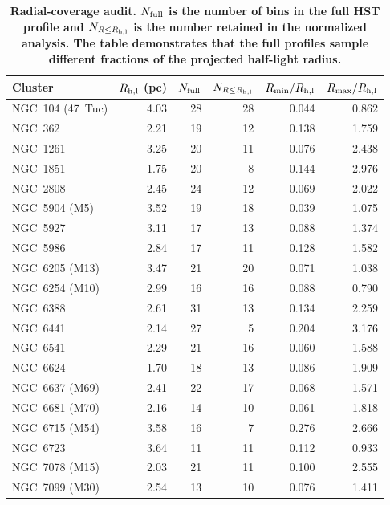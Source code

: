 \begin{table}
\centering
\caption{\textbf{Radial-coverage audit. $N_{\rm full}$ is the number of bins in the full HST profile and $N_{R\leq R_{\rm h,l}}$ is the number retained in the normalized analysis. The table demonstrates that the full profiles sample different fractions of the projected half-light radius.}}
\label{tab:coverage}
\small
\setlength{\tabcolsep}{5pt}
\begin{tabular}{lrrrrr}
\hline
Cluster & $R_{\rm h,l}$ (pc) & $N_{\rm full}$ & $N_{R\leq R_{\rm h,l}}$ & $R_{\min}/R_{\rm h,l}$ & $R_{\max}/R_{\rm h,l}$ \\
\hline
NGC~104 (47~Tuc) & 4.03 & 28 & 28 & 0.044 & 0.862 \\
NGC~362 & 2.21 & 19 & 12 & 0.138 & 1.759 \\
NGC~1261 & 3.25 & 20 & 11 & 0.076 & 2.438 \\
NGC~1851 & 1.75 & 20 & 8 & 0.144 & 2.976 \\
NGC~2808 & 2.45 & 24 & 12 & 0.069 & 2.022 \\
NGC~5904 (M5) & 3.52 & 19 & 18 & 0.039 & 1.075 \\
NGC~5927 & 3.11 & 17 & 13 & 0.088 & 1.374 \\
NGC~5986 & 2.84 & 17 & 11 & 0.128 & 1.582 \\
NGC~6205 (M13) & 3.47 & 21 & 20 & 0.071 & 1.038 \\
NGC~6254 (M10) & 2.99 & 16 & 16 & 0.088 & 0.790 \\
NGC~6388 & 2.61 & 31 & 13 & 0.134 & 2.259 \\
NGC~6441 & 2.14 & 27 & 5 & 0.204 & 3.176 \\
NGC~6541 & 2.29 & 21 & 16 & 0.060 & 1.588 \\
NGC~6624 & 1.70 & 18 & 13 & 0.086 & 1.909 \\
NGC~6637 (M69) & 2.41 & 22 & 17 & 0.068 & 1.571 \\
NGC~6681 (M70) & 2.16 & 14 & 10 & 0.061 & 1.818 \\
NGC~6715 (M54) & 3.58 & 16 & 7 & 0.276 & 2.666 \\
NGC~6723 & 3.64 & 11 & 11 & 0.112 & 0.933 \\
NGC~7078 (M15) & 2.03 & 21 & 11 & 0.100 & 2.555 \\
NGC~7099 (M30) & 2.54 & 13 & 10 & 0.076 & 1.411 \\
\hline
\end{tabular}
\end{table}